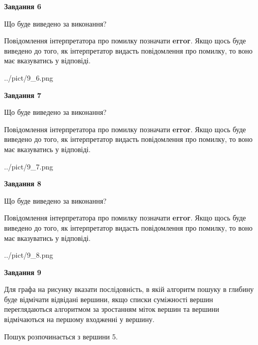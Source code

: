 \documentclass[12pt, ukrainian]{article}
\begin{document}
{\begin {large}
{\begin {center}\textbf{Завдання 6}\end {center}}\par
Що буде виведено за виконання?

Повідомлення інтерпретатора про помилку позначати \textbf{error}.
Якщо щось буде виведено до того, як інтерпретатор видасть повідомлення про помилку, 
то воно має вказуватись у відповіді. \par


\begin{center}
	{../pict/9_6.png}
\end{center}
\newpage

{\begin {center}\textbf{Завдання 7}\end {center}}\par
Що буде виведено за виконання?

Повідомлення інтерпретатора про помилку позначати \textbf{error}.
Якщо щось буде виведено до того, як інтерпретатор видасть повідомлення про помилку, 
то воно має вказуватись у відповіді. \par


\begin{center}
	{../pict/9_7.png}
\end{center}
\newpage

{\begin {center}\textbf{Завдання 8}\end {center}}\par
Що буде виведено за виконання?

Повідомлення інтерпретатора про помилку позначати \textbf{error}.
Якщо щось буде виведено до того, як інтерпретатор видасть повідомлення про помилку, 
то воно має вказуватись у відповіді. \par


\begin{center}
	{../pict/9_8.png}
\end{center}
\newpage

{\begin {center}\textbf{Завдання 9}\end {center}}\par
Для графа на рисунку вказати послідовність, в якій алгоритм пошуку в глибину буде відмічати відвідані вершини, якщо списки суміжності вершин переглядаються алгоритмом за зростанням міток вершин та вершини відмічаються на першому вход\-женні у вершину.\par
Пошук розпочинається з вершини 5.\par


\end{large}}
\end{document}
